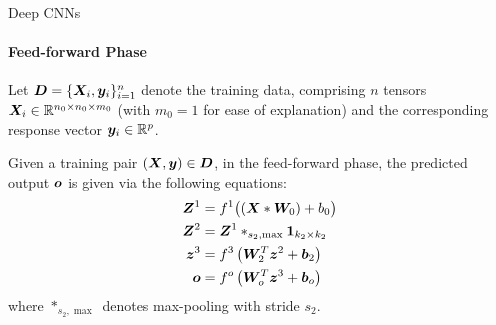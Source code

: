 %
%
%
%
\begin{frame}{Deep CNNs}
\framesubtitle{Feed-forward Phase}
Let ${\boldsymbol D} = \{{\boldsymbol X}_i, {\boldsymbol y}_i\}_{i=1}^n$ denote the training data,
comprising $n$ tensors ${\boldsymbol X}_i \in {\mathord{\mathbb R}}^{n_0 \times n_0 \times m_0}$ (with
$m_0 = 1$ for ease of explanation) and
the corresponding response vector ${\boldsymbol y}_i \in {\mathord{\mathbb R}}^p$.

\medskip

Given a training pair $({\boldsymbol X}, {\boldsymbol y}) \in {\boldsymbol D}$, 
in the feed-forward phase, the predicted output ${\boldsymbol o}$ is given via the
following equations:
\begin{align*}
    {\boldsymbol Z}^1 & = f^1\bigl( \left({\boldsymbol X} \ast {\boldsymbol W}_0\right) + b_0 \bigr)\\
    {\boldsymbol Z}^2 & = {\boldsymbol Z}^1 \ast_{s_2, \max} \mathbf{1}_{k_2 \times k_2}\\
    {\boldsymbol z}^3 & = f^3\left( {\boldsymbol W}^T_{2} {\boldsymbol z}^2 + {\boldsymbol b}_{2} \right)\\
    {\boldsymbol o} & = f^o \left( {\boldsymbol W}_o^T {\boldsymbol z}^3 + {\boldsymbol b}_o \right)
\end{align*}
where $\ast_{s_2,\max}$ denotes max-pooling with stride $s_2$. 
\end{frame}
%
%
